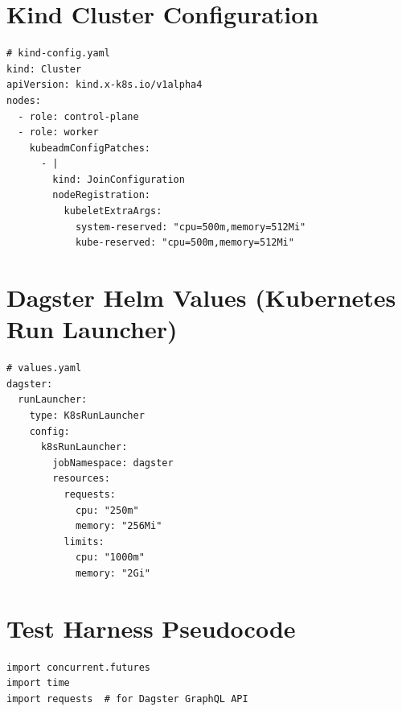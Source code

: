 
\begin{appendices}

\chapter{Kind Cluster Configuration}
\label{app:kind-config}

\begin{lstlisting}[style=yaml, caption={Kind cluster configuration (kind-config.yaml).}, label={lst:kind-config}]
# kind-config.yaml
kind: Cluster
apiVersion: kind.x-k8s.io/v1alpha4
nodes:
  - role: control-plane
  - role: worker
    kubeadmConfigPatches:
      - |
        kind: JoinConfiguration
        nodeRegistration:
          kubeletExtraArgs:
            system-reserved: "cpu=500m,memory=512Mi"
            kube-reserved: "cpu=500m,memory=512Mi"
\end{lstlisting}

\chapter{Dagster Helm Values (Kubernetes Run Launcher)}
\label{app:helm-values}

\begin{lstlisting}[style=yaml, caption={Dagster Helm values for Kubernetes Run Launcher (values.yaml).}, label={lst:helm-values}]
# values.yaml
dagster:
  runLauncher:
    type: K8sRunLauncher
    config:
      k8sRunLauncher:
        jobNamespace: dagster
        resources:
          requests:
            cpu: "250m"
            memory: "256Mi"
          limits:
            cpu: "1000m"
            memory: "2Gi"
\end{lstlisting}

\chapter{Test Harness Pseudocode}
\label{app:test-harness}

\begin{lstlisting}[style=python, caption={Test harness pseudocode for concurrent Dagster run submission.}, label={lst:test-harness}]
import concurrent.futures
import time
import requests  # for Dagster GraphQL API


\end{lstlisting}
\end{appendices}
